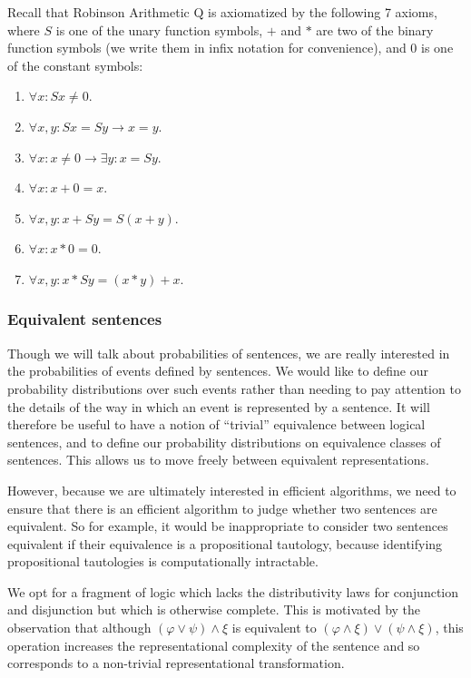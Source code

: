 \documentclass[12pt]{article}
\theoremstyle{definition}
\newcommand{\of}[1]{\left(#1\right)}
\newcommand{\RQ}{\text{Q}}
\newcommand{\vp}{\varphi}
\begin{document}
Recall that Robinson Arithmetic $\RQ$ is axiomatized by the following 7 axioms,
where $S$ is one of the unary function symbols,
$+$ and $*$ are two of the binary function symbols (we write
them in infix notation for convenience), and $0$ is one of the constant symbols:
\begin{enumerate}
\item $\forall x : S x \neq 0$.
\item $\forall x, y : S x = S y \rightarrow x =y$.
\item $\forall x : x \neq 0 \rightarrow \exists y : x = S y$.
\item $\forall x : x + 0 = x$.
\item $\forall x, y : x + S y = S(x + y)$.
\item $\forall x : x * 0 = 0$.
\item $\forall x, y : x * S y = (x * y) + x$.
\end{enumerate}


\subsubsection{Equivalent sentences}

Though we will talk about probabilities of sentences,
we are really interested in the probabilities of events
defined by sentences.
We would like to define
our probability distributions over such events
rather than needing to pay attention to the details
of the way in which an event is represented by a sentence.
It will therefore be useful to have a notion of
``trivial'' equivalence between logical sentences,
and to define our probability distributions on equivalence
classes of sentences.
This allows us to move freely between equivalent
representations.

However, because we are ultimately interested
in efficient algorithms,
we need to ensure that there is an efficient
algorithm to judge whether two sentences are equivalent.
So for example,
it would be inappropriate to consider
two sentences equivalent if their equivalence
is a propositional tautology,
because identifying propositional tautologies is
computationally intractable.

We opt for a fragment of logic
which lacks the distributivity
laws for conjunction and disjunction
but which is otherwise complete.
This is motivated by the observation that although $\of{\vp \vee \psi} \wedge \xi$
is equivalent to $\of{\vp \wedge \xi} \vee \of{\psi \wedge \xi}$,
this operation increases the representational complexity of
the sentence and so corresponds to a non-trivial representational transformation.
\end{document}
